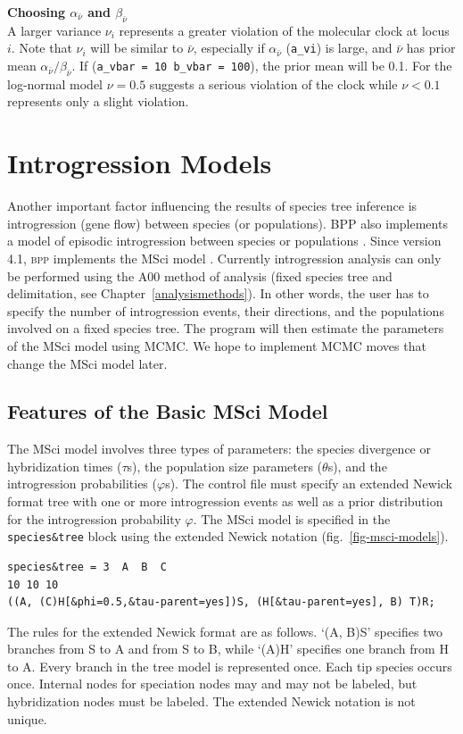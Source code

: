 \documentclass{book}
\numberwithin{equation}{section} \renewcommand{\baselinestretch}{0.55}
\begin{document}
\begin{mdframed}
  \textbf{Choosing $\alpha_{\bar{\nu}}$ and $\beta_{\bar{\nu}}$}\\
  A larger variance $\nu_i$ represents a greater violation of the
  molecular clock at locus $i$.  Note that $\nu_i$ will be similar to
  $\bar\nu$, especially if $\alpha_{\bar{\nu}}$ (\texttt{a\_vi}) is
  large, and $\bar\nu$ has prior mean
  $\alpha_{\bar{\nu}}/\beta_{\bar{\nu}}$.  If (\texttt{a\_vbar = 10
    b\_vbar = 100}), the prior mean will be 0.1.  For the log-normal
  model $\nu = 0.5$ suggests a serious violation of the clock while
  $\nu < 0.1$ represents only a slight violation.
\end{mdframed}

\chapter{Introgression Models}\label{introgression}
Another important factor influencing the results of species tree
inference is introgression (gene flow) between species (or
populations). BPP also implements a model of episodic introgression
between species or populations \cite{Flouri2020a}.  Since version 4.1,
\textsc{bpp} implements the MSci model \cite{Flouri2020a}.  Currently
introgression analysis can only be performed using the A00 method of
analysis (fixed species tree and delimitation, see
Chapter~\ref{analysismethods}).  In other words, the user has to
specify the number of introgression events, their directions, and the
populations involved on a fixed species tree.  The program will then
estimate the parameters of the MSci model using MCMC.  We hope to
implement MCMC moves that change the MSci model later.

\section{Features of the Basic MSci Model}
The MSci model involves three types of parameters: the species
divergence or hybridization times ($\tau$s), the population size
parameters ($\theta$s), and the introgression probabilities
($\varphi$s). The control file must specify an extended Newick format
tree with one or more introgression events as well as a prior
distribution for the introgression probability $\varphi$. The MSci
model is specified in the \texttt{species\&tree} block using the
extended Newick notation \citep{Cardona2008}
(fig.~\ref{fig-msci-models}).
\begin{verbatim}
species&tree = 3  A  B  C
10 10 10
((A, (C)H[&phi=0.5,&tau-parent=yes])S, (H[&tau-parent=yes], B) T)R;
\end{verbatim}
The rules for the extended Newick format are as follows.  `(A, B)S'
specifies two branches from S to A and from S to B, while ‘(A)H’
specifies one branch from H to A.  Every branch in the tree model is
represented once.  Each tip species occurs once.  Internal nodes for
speciation nodes may and may not be labeled, but hybridization nodes
must be labeled.  The extended Newick notation is not unique.
\end{document}
